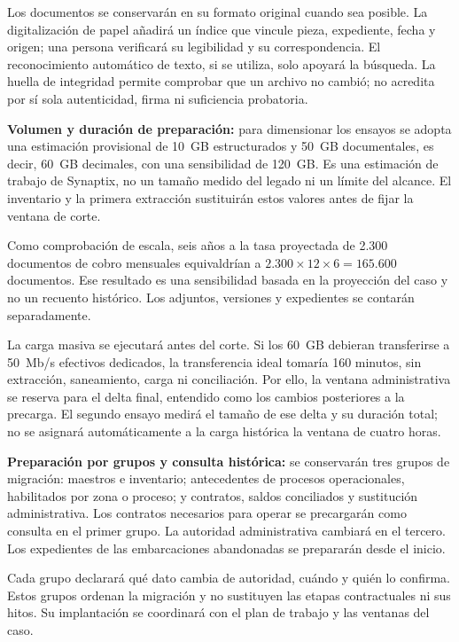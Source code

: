 Los documentos se conservarán en su formato original cuando sea posible. La digitalización de papel añadirá un índice que vincule pieza, expediente, fecha y origen; una persona verificará su legibilidad y su correspondencia. El reconocimiento automático de texto, si se utiliza, solo apoyará la búsqueda. La huella de integridad permite comprobar que un archivo no cambió; no acredita por sí sola autenticidad, firma ni suficiencia probatoria.

\textbf{Volumen y duración de preparación:} para dimensionar los ensayos se adopta una estimación provisional de 10~GB estructurados y 50~GB documentales, es decir, 60~GB decimales, con una sensibilidad de 120~GB. Es una estimación de trabajo de Synaptix, no un tamaño medido del legado ni un límite del alcance. El inventario y la primera extracción sustituirán estos valores antes de fijar la ventana de corte.

Como comprobación de escala, seis años a la tasa proyectada de 2.300 documentos de cobro mensuales equivaldrían a \(2.300 \times 12 \times 6 = 165.600\) documentos. Ese resultado es una sensibilidad basada en la proyección del caso y no un recuento histórico. Los adjuntos, versiones y expedientes se contarán separadamente.

La carga masiva se ejecutará antes del corte. Si los 60~GB debieran transferirse a 50~Mb/s efectivos dedicados, la transferencia ideal tomaría 160 minutos, sin extracción, saneamiento, carga ni conciliación. Por ello, la ventana administrativa se reserva para el delta final, entendido como los cambios posteriores a la precarga. El segundo ensayo medirá el tamaño de ese delta y su duración total; no se asignará automáticamente a la carga histórica la ventana de cuatro horas.

\textbf{Preparación por grupos y consulta histórica:} se conservarán tres grupos de migración: maestros e inventario; antecedentes de procesos operacionales, habilitados por zona o proceso; y contratos, saldos conciliados y sustitución administrativa. Los contratos necesarios para operar se precargarán como consulta en el primer grupo. La autoridad administrativa cambiará en el tercero. Los expedientes de las embarcaciones abandonadas se prepararán desde el inicio.

Cada grupo declarará qué dato cambia de autoridad, cuándo y quién lo confirma. Estos grupos ordenan la migración y no sustituyen las etapas contractuales ni sus hitos. Su implantación se coordinará con el plan de trabajo y las ventanas del caso.

